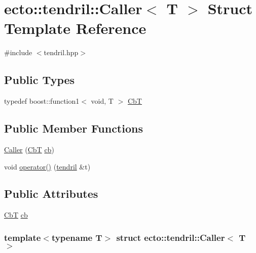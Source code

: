 \hypertarget{structecto_1_1tendril_1_1Caller}{\section{ecto\-:\-:tendril\-:\-:\-Caller$<$ \-T $>$ \-Struct \-Template \-Reference}
\label{structecto_1_1tendril_1_1Caller}
}


{\ttfamily \#include $<$tendril.\-hpp$>$}

\subsection*{\-Public \-Types}
\begin{DoxyCompactItemize}
\item 
typedef boost\-::function1$<$ void, \-T $>$ \hyperlink{structecto_1_1tendril_1_1Caller_a846333ac5c22cfb6eafb1c2240c0c623}{\-Cb\-T}
\end{DoxyCompactItemize}
\subsection*{\-Public \-Member \-Functions}
\begin{DoxyCompactItemize}
\item 
\hyperlink{structecto_1_1tendril_1_1Caller_a84b71a5526ff59dcbd6cb7a102f8d9db}{\-Caller} (\hyperlink{structecto_1_1tendril_1_1Caller_a846333ac5c22cfb6eafb1c2240c0c623}{\-Cb\-T} \hyperlink{structecto_1_1tendril_1_1Caller_afecdbc09ca504c16292a6365ab1cd950}{cb})
\item 
void \hyperlink{structecto_1_1tendril_1_1Caller_a19099e68a2059823575e71f45b2c0b20}{operator()} (\hyperlink{classecto_1_1tendril}{tendril} \&t)
\end{DoxyCompactItemize}
\subsection*{\-Public \-Attributes}
\begin{DoxyCompactItemize}
\item 
\hyperlink{structecto_1_1tendril_1_1Caller_a846333ac5c22cfb6eafb1c2240c0c623}{\-Cb\-T} \hyperlink{structecto_1_1tendril_1_1Caller_afecdbc09ca504c16292a6365ab1cd950}{cb}
\end{DoxyCompactItemize}
\subsubsection*{template$<$typename T$>$ struct ecto\-::tendril\-::\-Caller$<$ T $>$}



